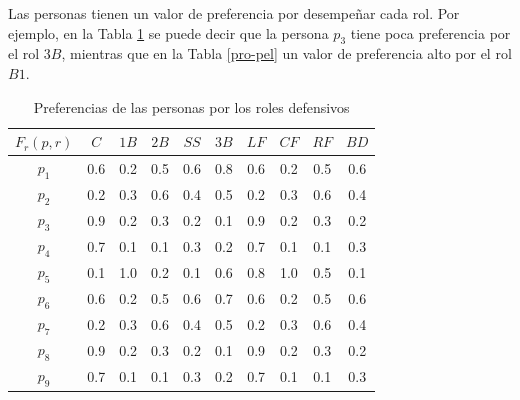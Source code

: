 Las personas tienen un valor de preferencia por desempeñar cada rol. Por ejemplo, en la Tabla \ref{prd-pel} se puede decir que la persona $ p_3 $ tiene poca preferencia por el rol $ 3B $, mientras que en la Tabla \ref{pro-pel} un valor de preferencia alto por el rol $B1$.
\begin{table}[H]
	\centering
	\caption{Preferencias de las personas por los roles defensivos}\label{prd-pel}
	\begin{tabular}{|c|c|c|c|c|c|c|c|c|c|}
		\hline
		$F_r(p,r)$ & $C$ & $1B$ & $2B$ & $SS$ & $3B$ & $LF$ & $CF$ & $RF$  & $BD$   \\ \hline
		$p_1$   & 0.6 & 0.2 & 0.5 & 0.6 & 0.8 & 0.6 & 0.2 & 0.5 & 0.6 \\ \hline
		$p_2$   & 0.2 & 0.3 & 0.6 & 0.4 & 0.5 & 0.2 & 0.3 & 0.6 & 0.4 \\ \hline
		$p_3$  	& 0.9 & 0.2 & 0.3 & 0.2 & 0.1 & 0.9 & 0.2 & 0.3 & 0.2 \\ \hline
		$p_4$ 	& 0.7 & 0.1 & 0.1 & 0.3 & 0.2 & 0.7 & 0.1 & 0.1 & 0.3 \\ \hline
		$p_5$   & 0.1 & 1.0 & 0.2 & 0.1 & 0.6 & 0.8 & 1.0 & 0.5 & 0.1 \\ \hline
		$p_6$   & 0.6 & 0.2 & 0.5 & 0.6 & 0.7 & 0.6 & 0.2 & 0.5 & 0.6 \\ \hline
		$p_7$   & 0.2 & 0.3 & 0.6 & 0.4 & 0.5 & 0.2 & 0.3 & 0.6 & 0.4 \\ \hline
		$p_8$  	& 0.9 & 0.2 & 0.3 & 0.2 & 0.1 & 0.9 & 0.2 & 0.3 & 0.2 \\ \hline
		$p_9$ 	& 0.7 & 0.1 & 0.1 & 0.3 & 0.2 & 0.7 & 0.1 & 0.1 & 0.3 \\ \hline
	\end{tabular}
\end{table}

\begin{table}[H]
	\centering
	\caption{Preferencias de las personas por los roles ofensivos}\label{pro-pel}
\end{table}

